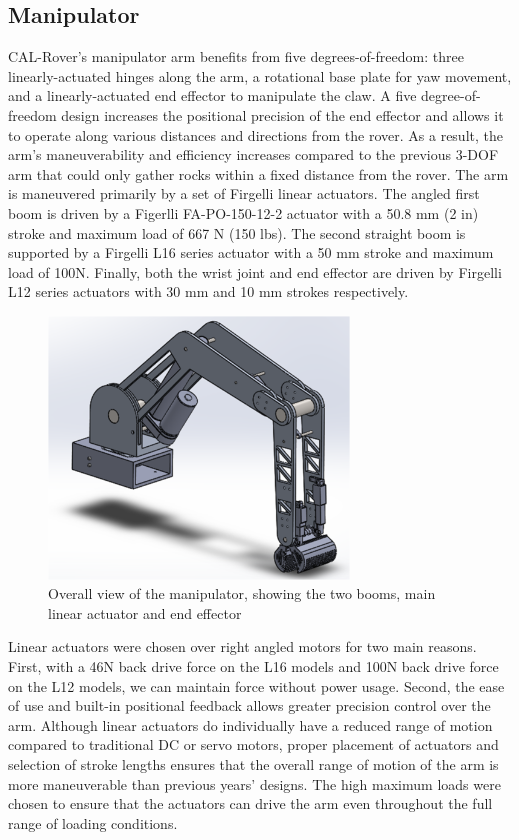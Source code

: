 \documentclass[titlepage,twocolumn,10pt]{article}
\begin{document}
    \subsection{Manipulator}
    CAL-Rover's manipulator arm benefits from five degrees-of-freedom: three linearly-actuated hinges along the arm, a rotational base plate for yaw movement, and a linearly-actuated end effector to manipulate the claw. A five degree-of-freedom design increases the positional precision of the end effector and allows it to operate along various distances and directions from the rover. As a result, the arm's maneuverability and efficiency increases compared to the previous 3-DOF arm that could only gather rocks within a fixed distance from the rover. The arm is maneuvered primarily by a set of Firgelli linear actuators. The angled first boom is driven by a Figerlli FA-PO-150-12-2 actuator with a 50.8 mm (2 in) stroke and maximum load of 667 N (150 lbs). The second straight boom is supported by a Firgelli L16 series actuator with a 50 mm stroke and maximum load of 100N. Finally, both the wrist joint and end effector are driven by Firgelli L12 series actuators with 30 mm and 10 mm strokes respectively.

    \begin{figure}[H]
        \centering
        \includegraphics*[width = 8cm]{images/manip.png}
        \caption{Overall view of the manipulator, showing the two booms, main linear actuator and end effector}
    \end{figure}

    Linear actuators were chosen over right angled motors for two main reasons. First, with a 46N back drive force on the L16 models and 100N back drive force on the L12 models, we can maintain force without power usage. Second, the ease of use and built-in positional feedback allows greater precision control over the arm. Although linear actuators do individually have a reduced range of motion compared to traditional DC or servo motors, proper placement of actuators and selection of stroke lengths ensures that the overall range of motion of the arm is more maneuverable than previous years' designs. The high maximum loads were chosen to ensure that the actuators can drive the arm even throughout the full range of loading conditions.
\end{document}
